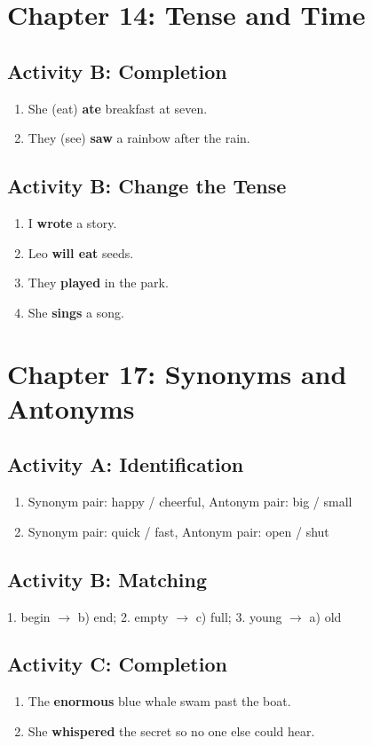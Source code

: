 \section*{Chapter 14: Tense and Time}
\subsection*{Activity B: Completion}
\begin{enumerate}
    \item She (eat) \textbf{ate} breakfast at seven.
    \item They (see) \textbf{saw} a rainbow after the rain.
\end{enumerate}
\subsection*{Activity B: Change the Tense}
\begin{enumerate}
    \item I \textbf{wrote} a story.
    \item Leo \textbf{will eat} seeds.
    \item They \textbf{played} in the park.
    \item She \textbf{sings} a song.
\end{enumerate}

\section*{Chapter 17: Synonyms and Antonyms}
\subsection*{Activity A: Identification}
\begin{enumerate}
    \item Synonym pair: happy / cheerful, Antonym pair: big / small
    \item Synonym pair: quick / fast, Antonym pair: open / shut
\end{enumerate}
\subsection*{Activity B: Matching}
1. begin $\rightarrow$ b) end; 2. empty $\rightarrow$ c) full; 3. young $\rightarrow$ a) old
\subsection*{Activity C: Completion}
\begin{enumerate}
    \item The \textbf{enormous} blue whale swam past the boat.
    \item She \textbf{whispered} the secret so no one else could hear.
\end{enumerate}


